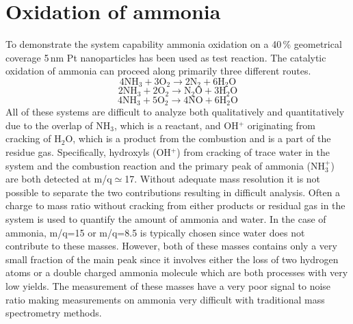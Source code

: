 \documentclass[aip,rsi]{revtex4-1}
\begin{document}
\section{Oxidation of ammonia}
To demonstrate the system capability ammonia oxidation on a 40\,\% geometrical coverage 5\,nm Pt nanoparticles has been used as test reaction. The catalytic oxidation of ammonia can proceed along primarily three different routes\cite{Imbihl2007}.
\begin{equation}
4\mathrm{NH}_3+3\mathrm{O}_2\rightarrow 2\mathrm{N}_2 + 6\mathrm{H}_2\mathrm{O}
\label{eq:Pt_clean_combustion}
\end{equation}
\begin{equation}
2\mathrm{NH}_3+2\mathrm{O}_2\rightarrow \mathrm{N}_2\mathrm{O} + 3\mathrm{H}_2\mathrm{O}
\end{equation}
\begin{equation}
4\mathrm{NH}_3+5\mathrm{O}_2\rightarrow 4\mathrm{NO} + 6\mathrm{H}_2\mathrm{O}
\end{equation}
All of these systems are difficult to analyze both qualitatively and quantitatively due to the overlap of NH$_3$, which is a reactant, and OH$^+$ originating from cracking of H$_2$O, which is a product from the combustion and is a part of the residue gas. Specifically, hydroxyls (OH$^{+}$) from cracking of trace water in the system and the combustion reaction and the primary peak of ammonia (NH$_{3}^{+}$) are both detected at m/q$\simeq$17. Without adequate mass resolution it is not possible to separate the two contributions resulting in difficult analysis. Often a charge to mass ratio without cracking from either products or residual gas in the system is used to quantify the amount of ammonia and water. In the case of ammonia, m/q=15 or m/q=8.5 is typically chosen since water does not contribute to these masses. However, both of these masses contains only a very small fraction of the main peak since it involves either the loss of two hydrogen atoms or a double charged ammonia molecule which are both processes with very low yields. The measurement of these masses have a very poor signal to noise ratio making measurements on ammonia very difficult with traditional mass spectrometry methods.
\end{document}
